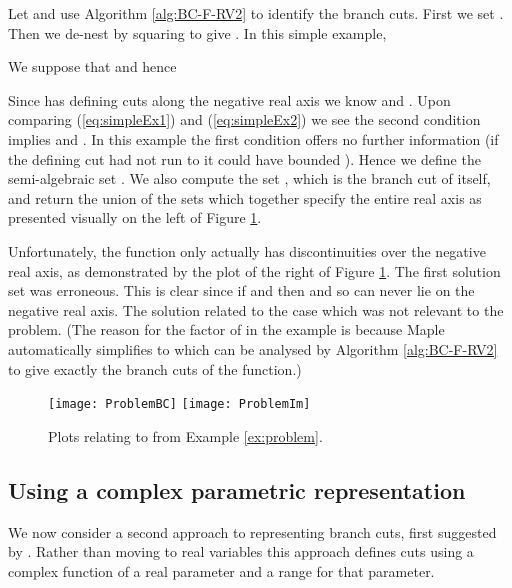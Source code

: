 \documentclass{llncs}
\begin{document}
\begin{example} \label{ex:problem}
Let  and use Algorithm \ref{alg:BC-F-RV2} to identify the branch cuts.  First we set .  Then we de-nest by squaring to give .  In this simple example, 

We suppose that  and hence

Since  has defining cuts along the negative real axis we know  and .  Upon comparing (\ref{eq:simpleEx1}) and  (\ref{eq:simpleEx2}) we see the second condition implies  and .  In this example the first condition offers no further information (if the defining cut had not run to  it could have bounded ).  Hence we define the semi-algebraic set .  
We also compute the set , which is the branch cut of  itself, and return the union of the sets which together specify the entire real axis as presented visually on the left of Figure \ref{fig:problem}.  

Unfortunately, the function only actually has discontinuities over the negative real axis, as demonstrated by the plot of the right of Figure \ref{fig:problem}.  The first solution set was erroneous.  This is clear since if  and  then  and so can never lie on the negative real axis.  The solution related to the case  which was not relevant to the problem.  
(The reason for the factor of  in the example is because {\sc Maple} automatically simplifies  to  which can be analysed by Algorithm \ref{alg:BC-F-RV2} to give exactly the branch cuts of the function.)
\end{example}

\begin{figure}[ht] 
\begin{center}
\texttt{[image: ProblemBC]}
\hspace*{0.3cm}
\texttt{[image: ProblemIm]}
\end{center}
\caption{Plots relating to  from Example \ref{ex:problem}.} 
\label{fig:problem}
\end{figure}

\subsection{Using a complex parametric representation}

We now consider a second approach to representing branch cuts, first suggested by \cite{DF94}.  Rather than moving to real variables this approach defines cuts using a complex function of a real parameter and a range for that parameter.
\end{document}
